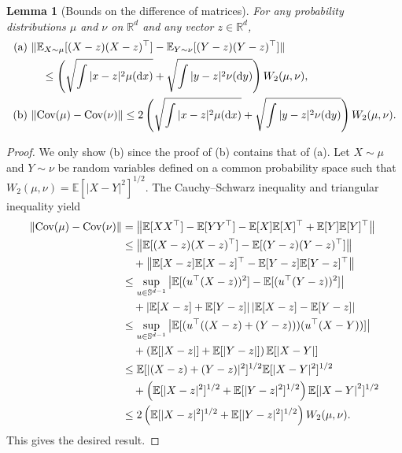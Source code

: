 \documentclass[12pt,reqno]{amsart}
\newtheorem{lemma}[theorem]{Lemma}
\theoremstyle{remark}
\theoremstyle{definition}
\newcommand{\bbS}{\mathbb{S}}
\newcommand{\R}{\mathbb{R}}
\newcommand{\E}{\mathbb{E}}
\newcommand{\Cov}{\textnormal{Cov}}
\newcommand{\diff}{\mathrm{d}}
\begin{document}
\begin{lemma}[Bounds on the difference of matrices]\label{lem:cov}
    For any probability distributions $\mu$ and $\nu$ on $\R^{d}$ and any vector $z\in\R^{d}$,
    \begin{align*}
        \textnormal{(a) }&\|\E_{X\sim\mu}[(X-z)(X-z)^{\top}]-\E_{Y\sim\nu}[(Y-z)(Y-z)^{\top}]\|\\
        &\quad\le \left(\sqrt{\int|x-z|^{2}\mu(\diff x)}+\sqrt{\int|y-z|^{2}\nu(\diff y)}\right)W_{2}(\mu,\nu),\\
        \textnormal{(b) }&\|\Cov(\mu)-\Cov(\nu)\|\le 2\left(\sqrt{\int|x-z|^{2}\mu(\diff x)}+\sqrt{\int|y-z|^{2}\nu(\diff y)}\right)W_{2}(\mu,\nu).
    \end{align*}
\end{lemma}

\begin{proof}
    We only show (b) since the proof of (b) contains that of (a).
    Let $X\sim\mu$ and $Y\sim\nu$ be random variables defined on a common probability space such that $W_{2}(\mu,\nu)=\E[|X-Y|^{2}]^{1/2}$.
    The Cauchy--Schwarz inequality and triangular inequality yield
    \begin{align*}
        \|\Cov(\mu)-\Cov(\nu)\|&=\left\|\E[XX^{\top}]-\E[YY^{\top}]-\E[X]\E[X]^{\top}+\E[Y]\E[Y]^{\top}\right\|\\
        &\le \left\|\E[(X-z)(X-z)^{\top}]-\E[(Y-z)(Y-z)^{\top}]\right\|\\
        &\quad+\left\|\E[X-z]\E[X-z]^{\top}-\E[Y-z]\E[Y-z]^{\top}\right\|\\
        &\le \sup_{u\in\bbS^{d-1}}\left|\E[(u^{\top}(X-z))^{2}]-\E[(u^{\top}(Y-z))^{2}]\right|\\
        &\quad+\left|\E[X-z]+\E[Y-z]\right|\left|\E[X-z]-\E[Y-z]\right|\\
        &\le \sup_{u\in\bbS^{d-1}}\left|\E[(u^{\top}((X-z)+(Y-z)))(u^{\top}(X-Y))]\right|\\
        &\quad+\left(\E[|X-z|]+\E[|Y-z|]\right)\E[\left|X-Y\right|]\\
        &\le \E[|(X-z)+(Y-z)|^{2}]^{1/2}\E[|X-Y|^{2}]^{1/2}\\
        &\quad+\left(\E[|X-z|^{2}]^{1/2}+\E[|Y-z|^{2}]^{1/2}\right)\E[\left|X-Y\right|^{2}]^{1/2}\\
        &\le 2\left(\E[|X-z|^{2}]^{1/2}+\E[|Y-z|^{2}]^{1/2}\right)W_{2}(\mu,\nu).
    \end{align*}
    This gives the desired result.
\end{proof}
\end{document}
